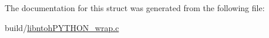 The documentation for this struct was generated from the following file\-:\begin{DoxyCompactItemize}
\item 
build/\hyperlink{libntoh_p_y_t_h_o_n__wrap_8c}{libntoh\-P\-Y\-T\-H\-O\-N\-\_\-wrap.\-c}\end{DoxyCompactItemize}
